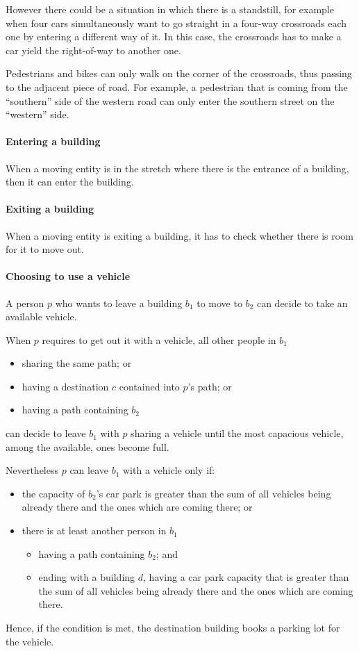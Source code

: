However there could be a situation in which there is a standstill,
for example when four cars simultaneously want to go straight in
a four-way crossroads each one by entering a different way of it.
In this case, the crossroads has to make a car yield the right-of-way
to another one.

Pedestrians and bikes can only walk on the corner of the crossroads, thus
passing to the adjacent piece of road.
For example, a pedestrian that is coming from the ``southern'' side of the
western road can only enter the southern street on the ``western'' side.

\paragraph{Entering a building}
When a moving entity is in the stretch where there is the entrance of a
building, then it can enter the building.

\paragraph{Exiting a building}
When a moving entity is exiting a building, it has to check whether there is
room for it to move out.

\paragraph{Choosing to use a vehicle}
A person $p$ who wants to leave a building $b_1$ to move to $b_2$ can decide
to take an available vehicle.

When $p$ requires to get out it with a vehicle, all other people in $b_1$
\begin{itemize}
\item sharing the same path; or
\item having a destination $c$ contained into $p$'s path; or
\item having a path containing $b_2$
\end{itemize}
can decide to leave $b_1$ with $p$ sharing a vehicle
until the most capacious vehicle, among the available, ones become full.

Nevertheless $p$ can leave $b_1$ with a vehicle only if:
\begin{itemize}
\item the capacity of $b_2$'s car park is greater than the sum of all
vehicles being already there and the ones which are coming there; or
\item there is at least another person in $b_1$
  \begin{itemize}
  \item having a path containing $b_2$; and
  \item ending with a building $d$, having a car park capacity that is
    greater than the sum of all vehicles being already there and the ones
    which are coming there.
  \end{itemize}
\end{itemize}
Hence, if the condition is met, the destination building books
a parking lot for the vehicle.

